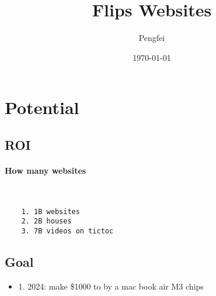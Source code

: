 \documentclass[12pt]{article}
\begin{document}
\title{Flips Websites}
\author{Pengfei}
\date{\today}
\maketitle

\section{Potential}
\subsection{ROI}
\paragraph{How many websites}~\\
\begin{verbatim}
    1. 1B websites
    2. 2B houses
    3. 7B videos on tictoc
\end{verbatim}

\subsection{Goal}
\begin{itemize}
    \item 1. 2024: make \$1000 to by a mac book air M3 chips
\end{itemize}



    
\end{document}

